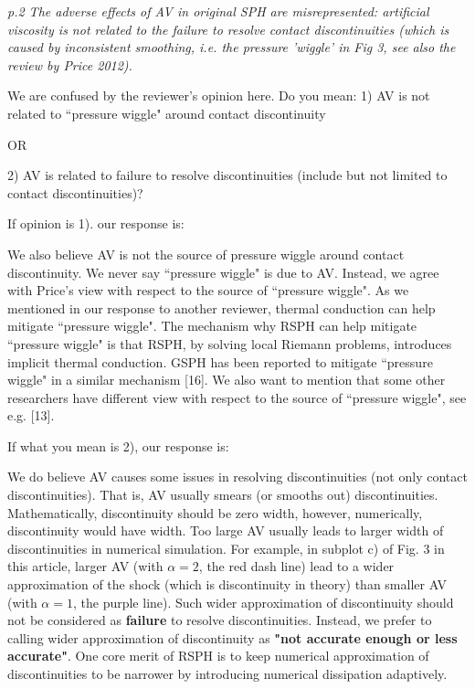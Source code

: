 \documentclass[10pt,a4paper]{article}
\begin{document}
\textit{p.2 The adverse effects of AV in original SPH are misrepresented: artificial viscosity is not related to the failure to resolve contact discontinuities (which is caused by inconsistent smoothing, i.e. the pressure 'wiggle' in Fig 3, see also the review by Price 2012).}

We are confused by the reviewer's opinion here.
Do you mean: 
1) AV is not related to ``pressure wiggle" around contact discontinuity

OR
 
2) AV is related to failure to resolve discontinuities (include but not limited to contact discontinuities)? 

If opinion is 1). our response is: 

We also believe AV is not the source of pressure wiggle around contact discontinuity.
We never say ``pressure wiggle" is due to AV. Instead, we agree with Price's view with respect to the source of ``pressure wiggle". As we mentioned in our response to another reviewer, thermal conduction can help mitigate ``pressure wiggle". The mechanism why RSPH can help mitigate ``pressure wiggle" is that RSPH, by solving local Riemann problems, introduces implicit thermal conduction. GSPH has been reported to mitigate ``pressure wiggle" in a similar mechanism [16]. We also want to mention that some other researchers have different view with respect to the source of ``pressure wiggle", see e.g. [13].

If what you mean is 2), our response is:

We do believe AV causes some issues in resolving discontinuities (not only contact discontinuities). That is, AV usually smears (or smooths out) discontinuities. Mathematically, discontinuity should be zero width, however, numerically, discontinuity would have width. Too large AV usually leads to larger width of discontinuities in numerical simulation. For example, in subplot c) of Fig. 3 in this article, larger AV (with $\alpha = 2$, the red dash line) lead to a wider approximation of the shock (which is discontinuity in theory) than smaller AV (with $\alpha = 1$, the purple line). 
Such wider approximation of discontinuity should not be considered as \textbf{failure} to resolve discontinuities. Instead, we prefer to calling wider approximation of discontinuity as \textbf{"not accurate enough or less accurate"}. One core merit of RSPH is to keep numerical approximation of discontinuities to be narrower by introducing numerical dissipation adaptively.
\\[3pt]
 
\end{document}
